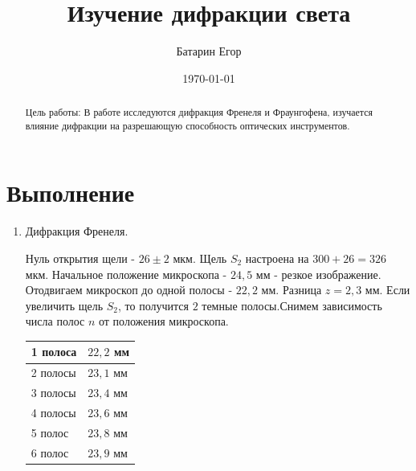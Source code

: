 \documentclass[a4paper,12pt]{article}
\author{Батарин Егор}
\title{Изучение дифракции света}
\date{\today}
\theoremstyle{plain} %
\theoremstyle{definition} %
\theoremstyle{remark} %
\begin{document}
 
\maketitle
 
\begin{abstract}
   Цель работы: В работе исследуются дифракция Френеля и Фраунгофена, изучается влияние дифракции на разрешающую способность оптических инструментов.
\end{abstract}
\section{Выполнение}
\begin{enumerate}
\item Дифракция Френеля.
 
 Нуль открытия щели - $26 \pm 2$ мкм. Щель $S_2$ настроена на $300+26=326$ мкм. Начальное положение микроскопа - $24,5$ мм - резкое изображение. Отодвигаем микроскоп до одной полосы - $22,2$ мм. Разница $z = 2,3$ мм. Если увеличить щель $S_2$, то получится $2$ темные полосы.Снимем зависимость числа полос $n$ от положения микроскопа.
 
 	\begin{table}[h!]
 		\begin{center}
 		\begin{tabular}{|l|l|}
 			\hline
 			1 полоса	& $22,2$ мм \\ \hline
 			2 полосы	& $23,1$ мм \\ \hline
 			3 полосы	& $23,4$ мм \\ \hline
 			4 полосы	& $23,6$ мм\\ \hline
 			5 полос	& $23,8$ мм \\ \hline
 			6 полос	& $23,9$ мм \\ \hline
 		\end{tabular}
 	 \end{center}
 	\end{table}



\end{enumerate}
\end{document}
